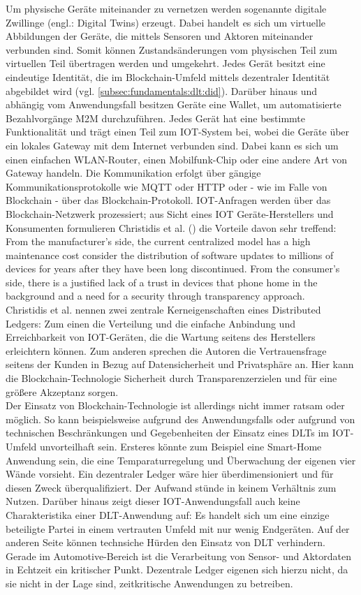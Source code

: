 Um physische Geräte miteinander zu vernetzen werden sogenannte digitale Zwillinge (engl.: Digital Twins) erzeugt. Dabei handelt es sich um virtuelle Abbildungen der Geräte, die mittels Sensoren und Aktoren miteinander verbunden sind. Somit können Zustandsänderungen vom physischen Teil zum virtuellen Teil übertragen werden und umgekehrt. Jedes Gerät besitzt eine eindeutige Identität, die im Blockchain-Umfeld mittels dezentraler Identität abgebildet wird (vgl. \ref{subsec:fundamentals:dlt:did}). Darüber hinaus und abhängig vom Anwendungsfall besitzen Geräte eine Wallet, um automatisierte Bezahlvorgänge \ac{M2M} durchzuführen. Jedes Gerät hat eine bestimmte Funktionalität und trägt einen Teil zum IOT-System bei, wobei die Geräte über ein lokales Gateway mit dem Internet verbunden sind. Dabei kann es sich um einen einfachen WLAN-Router, einen Mobilfunk-Chip oder eine andere Art von Gateway handeln. Die Kommunikation erfolgt über gängige Kommunikationsprotokolle wie MQTT oder HTTP oder - wie im Falle von Blockchain - über das Blockchain-Protokoll. \ac{IOT}-Anfragen werden über das Blockchain-Netzwerk prozessiert; aus Sicht eines \ac{IOT} Geräte-Herstellers und Konsumenten formulieren Christidis et al. (\cite{SCIOT2016}) die Vorteile davon sehr treffend:\\
\glqq From the manufacturer's side, the current centralized model has a high maintenance cost consider the distribution of software updates to millions of devices for years after they have been long discontinued. From the consumer's side, there is a justified lack of a trust in devices that phone home in the background and a need for a security through transparency approach.\grqq\\
Christidis et al. nennen zwei zentrale Kerneigenschaften eines Distributed Ledgers: Zum einen die Verteilung und die einfache Anbindung und Erreichbarkeit von \ac{IOT}-Geräten, die die Wartung seitens des Herstellers erleichtern können. Zum anderen sprechen die Autoren die Vertrauensfrage seitens der Kunden in Bezug auf Datensicherheit und Privatsphäre an. Hier kann die Blockchain-Technologie \glqq Sicherheit durch Transparenz\grqq erzielen und für eine größere Akzeptanz sorgen.\\
Der Einsatz von Blockchain-Technologie ist allerdings nicht immer ratsam oder möglich. So kann beispielsweise aufgrund des Anwendungsfalls oder aufgrund von technischen Beschränkungen und Gegebenheiten der Einsatz eines \ac{DLT}s im \ac{IOT}-Umfeld unvorteilhaft sein. Ersteres könnte zum Beispiel eine Smart-Home Anwendung sein, die eine Temparaturregelung und Überwachung der eigenen vier Wände vorsieht. Ein dezentraler Ledger wäre hier überdimensioniert und für diesen Zweck überqualifiziert. Der Aufwand stünde in keinem Verhältnis zum Nutzen. Darüber hinaus zeigt dieser \ac{IOT}-Anwendungsfall auch keine Charakteristika einer \ac{DLT}-Anwendung auf: Es handelt sich um eine einzige beteiligte Partei in einem vertrauten Umfeld mit nur wenig Endgeräten. Auf der anderen Seite können technsiche Hürden den Einsatz von \ac{DLT} verhindern. Gerade im Automotive-Bereich ist die Verarbeitung von Sensor- und Aktordaten in Echtzeit ein kritischer Punkt. Dezentrale Ledger eigenen sich hierzu nicht, da sie nicht in der Lage sind, zeitkritische Anwendungen zu betreiben.\\
